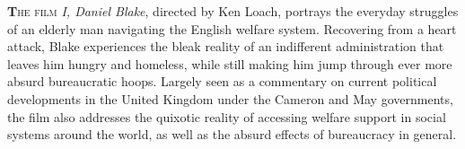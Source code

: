 
\lettrine[lines=2]{\bfseries\color{black}T}{he film} \textit{I, Daniel Blake}, directed by Ken Loach, portrays the everyday struggles of an elderly man navigating the English welfare system. Recovering from a heart attack, Blake experiences the bleak reality of an indifferent administration that leaves him hungry and homeless, while still making him jump through ever more absurd bureaucratic hoops. Largely seen as a commentary on current political developments in the United Kingdom under the Cameron and May governments, the film also addresses the quixotic reality of accessing welfare support in social systems around the world, as well as the absurd effects of bureaucracy in general.
\par
